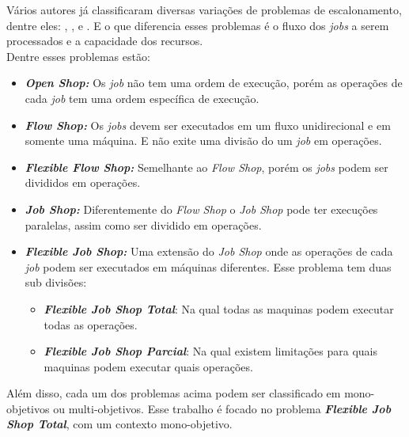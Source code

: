 Vários autores já classificaram diversas variações de problemas de escalonamento, dentre eles: \cite{graham1979}, \cite{Lenstra1979}, e \cite{maccarthy1993}. E o que diferencia esses problemas é o fluxo dos \textit{jobs} a serem processados e a capacidade dos recursos.\\
\noindent Dentre esses problemas estão:
\begin{itemize}
    \item \textbf{\textit{Open Shop:}} Os \textit{job} não tem uma ordem de execução, porém as operações de cada \textit{job} tem uma ordem específica de execução.
    
    \item \textbf{\textit{Flow Shop:}} Os \textit{jobs} devem ser executados em um fluxo unidirecional e em somente uma máquina. E não exite uma divisão do um \textit{job} em operações.
    
    \item \textbf{\textit{Flexible Flow Shop:}} Semelhante ao \textit{Flow Shop}, porém os \textit{jobs} podem ser divididos em operações.
    
    \item \textbf{\textit{Job Shop:}} Diferentemente do \textit{Flow Shop} o \textit{Job Shop} pode ter execuções paralelas, assim como ser dividido em operações.
    
    \item \textbf{\textit{Flexible Job Shop:}} Uma extensão do \textit{Job Shop} onde as operações de cada \textit{job} podem ser executados em máquinas diferentes. Esse problema tem duas sub divisões:
    \begin{itemize}
    \item \textbf{\textit{Flexible Job Shop Total}}: Na qual todas as maquinas podem executar todas as operações. 
    \item \textbf{\textit{Flexible Job Shop Parcial}}: Na qual existem limitações para quais maquinas podem executar quais operações.
    \end{itemize}
\end{itemize}
\noindent Além disso, cada um dos problemas acima podem ser classificado em mono-objetivos ou multi-objetivos. Esse trabalho é focado no problema \textbf{\textit{Flexible Job Shop Total}}, com um contexto mono-objetivo.
